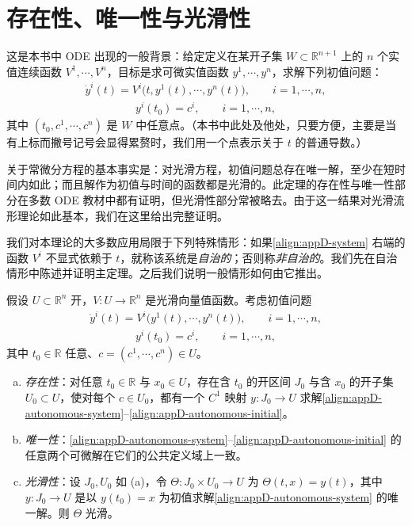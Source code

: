 \documentclass[../../main.tex]{subfiles}
\begin{document}
\section{存在性、唯一性与光滑性}\label{section:appD-existence-uniqueness-smoothness}

这是本书中 ODE 出现的一般背景：给定定义在某开子集 $W\subset\mathbb R^{n+1}$ 上的 $n$ 个实值连续函数 $V^1,\cdots ,V^n$，目标是求可微实值函数 $y^1,\cdots ,y^n$，求解下列初值问题：
\begin{align}\label{align:appD-system}
\dot y^i(t)=V^i\big(t,y^1(t),\cdots ,y^n(t)\big),\qquad i=1,\cdots ,n,
\end{align}
\begin{align}\label{align:appD-initial}
y^i(t_0)=c^i,\qquad i=1,\cdots ,n,
\end{align}
其中 $(t_0,c^1,\cdots ,c^n)$ 是 $W$ 中任意点。（本书中此处及他处，只要方便，主要是当有上标而撇号记号会显得累赘时，我们用一个点表示关于 $t$ 的普通导数。）

关于常微分方程的基本事实是：对光滑方程，初值问题总存在唯一解，至少在短时间内如此；而且解作为初值与时间的函数都是光滑的。此定理的存在性与唯一性部分在多数 ODE 教材中都有证明，但光滑性部分常被略去。由于这一结果对光滑流形理论如此基本，我们在这里给出完整证明。

我们对本理论的大多数应用局限于下列特殊情形：如果\eqref{align:appD-system} 右端的函数 $V^i$ 不显式依赖于 $t$，就称该系统是\emph{自治的}；否则称\emph{非自治的}。我们先在自治情形中陈述并证明主定理。之后我们说明一般情形如何由它推出。

\begin{theorem}\label{theorem:appD-autonomous-fundamental}
假设 $U\subset\mathbb R^n$ 开，$V:U\to\mathbb R^n$ 是光滑向量值函数。考虑初值问题
\begin{align}\label{align:appD-autonomous-system}
\dot y^i(t)=V^i\big(y^1(t),\cdots ,y^n(t)\big),\qquad i=1,\cdots ,n,
\end{align}
\begin{align}\label{align:appD-autonomous-initial}
y^i(t_0)=c^i,\qquad i=1,\cdots ,n,
\end{align}
其中 $t_0\in\mathbb R$ 任意、$c=(c^1,\cdots ,c^n)\in U$。
\begin{enumerate}[(a)]
\item \emph{存在性}：对任意 $t_0\in\mathbb R$ 与 $x_0\in U$，存在含 $t_0$ 的开区间 $J_0$ 与含 $x_0$ 的开子集 $U_0\subset U$，使对每个 $c\in U_0$，都有一个 $C^1$ 映射 $y:J_0\to U$ 求解\eqref{align:appD-autonomous-system}--\eqref{align:appD-autonomous-initial}。
\item \emph{唯一性}：\eqref{align:appD-autonomous-system}--\eqref{align:appD-autonomous-initial} 的任意两个可微解在它们的公共定义域上一致。
\item \emph{光滑性}：设 $J_0,U_0$ 如 (a)，令 $\Theta:J_0\times U_0\to U$ 为 $\Theta(t,x)=y(t)$，其中 $y:J_0\to U$ 是以 $y(t_0)=x$ 为初值求解\eqref{align:appD-autonomous-system} 的唯一解。则 $\Theta$ 光滑。
\end{enumerate}
\end{theorem}
\end{document}
